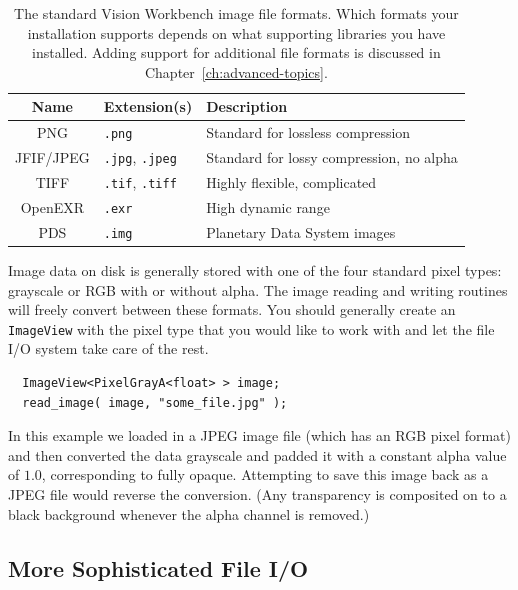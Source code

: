 \begin{table}[t]\begin{centering}
\begin{tabular}{|c|l|l|} \hline
Name & Extension(s) & Description \\ \hline \hline
PNG & \verb#.png# & Standard for lossless compression \\ \hline
JFIF/JPEG & \verb#.jpg#, \verb#.jpeg# & Standard for lossy compression, no alpha \\ \hline
TIFF & \verb#.tif#, \verb#.tiff# & Highly flexible, complicated \\ \hline
OpenEXR & \verb#.exr# & High dynamic range \\ \hline
PDS & \verb#.img# & Planetary Data System images \\ \hline
\end{tabular}
\caption{The standard Vision Workbench image file formats.  Which formats 
your installation supports depends on what supporting libraries you have 
installed.  Adding support for additional file formats is discussed in 
Chapter~\ref{ch:advanced-topics}.}
\label{tbl:file-formats}
\end{centering}\end{table}

Image data on disk is generally stored with one of the four standard
pixel types: grayscale or RGB with or without alpha.  The image
reading and writing routines will freely convert between these
formats.  You should generally create an \verb#ImageView# with the
pixel type that you would like to work with and let the file I/O
system take care of the rest.
\begin{verbatim}
  ImageView<PixelGrayA<float> > image;
  read_image( image, "some_file.jpg" );
\end{verbatim}
In this example we loaded in a JPEG image file (which has an RGB pixel
format) and then converted the data grayscale and padded it with a
constant alpha value of $1.0$, corresponding to fully opaque.  
Attempting to save this image back as a JPEG file would reverse the 
conversion.  (Any transparency is composited on to a black background 
whenever the alpha channel is removed.)

\subsection{More Sophisticated File I/O}

